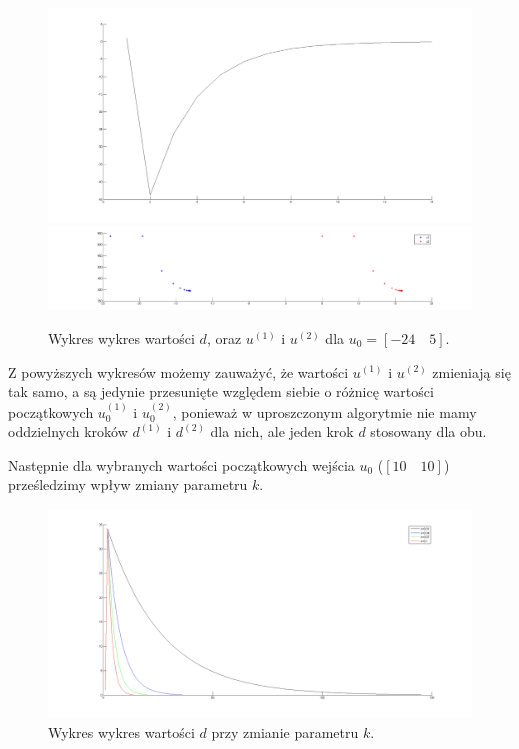 \documentclass[a4paper,10pt]{article}
\begin{document}
\begin{figure}[!h]
    \centering
	\includegraphics[width=120mm]{CW4-alg1fun1-u-24_5-k01-d.png}
	\includegraphics[width=120mm]{CW4-alg1fun1-u-24_5-k01-u.png}
	\caption{Wykres wykres wartości $d$, oraz $u^{(1)}$ i $u^{(2)}$ dla $u_0=[-24 \quad 5]$.}
    \label{fig:Rysunek}
\end{figure}

\newpage Z powyższych wykresów możemy zauważyć, że wartości $u^{(1)}$ i $u^{(2)}$ zmieniają się tak samo, a są jedynie przesunięte względem siebie o różnicę wartości początkowych $u_0^{(1)}$ i $u_0^{(2)}$, ponieważ w uproszczonym algorytmie nie mamy oddzielnych kroków $d^{(1)}$ i $d^{(2)}$ dla nich, ale jeden krok $d$ stosowany dla obu.

Następnie dla wybranych wartości początkowych wejścia $u_0$ ($[10 \quad 10]$) prześledzimy wpływ zmiany parametru $k$.
\begin{figure}[!h]
    \centering
	\includegraphics[width=120mm]{CW4-alg1fun1-u10_10-k001_01-d.png}
	\caption{Wykres wykres wartości $d$ przy zmianie parametru $k$.}
    \label{fig:Rysunek}
\end{figure}
\end{document}
